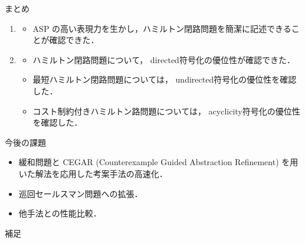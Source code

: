 \documentclass[dvipdfmx,10pt]{beamer}
\begin{document}
\begin{frame}{まとめ}
    \begin{enumerate}
    \item {}
      \begin{itemize}
      \item ASP の高い表現力を生かし，ハミルトン閉路問題を簡潔に記述できることが確認できた．
      \end{itemize}
    \item {}
      \begin{itemize}
      \item ハミルトン閉路問題について，
        \textsf{directed}符号化の優位性が確認できた．
      \item 最短ハミルトン閉路問題については，
        \textsf{undirected}符号化の優位性を確認した．
      \item コスト制約付きハミルトン路問題については，
        \textsf{acyclicity}符号化の優位性を確認した．
      \end{itemize}
    \end{enumerate}
  \begin{alertblock}{今後の課題}
    \begin{itemize}
    \item 緩和問題と CEGAR (Counterexample Guided Abstraction Refinement) 
	  を用いた解法を応用した考案手法の高速化．
    \item 巡回セールスマン問題への拡張．
    \item 他手法との性能比較．
    \end{itemize}
  \end{alertblock}
\end{frame}
\begin{frame}[noframenumbering]{}
  補足
\end{frame}
\end{document}
